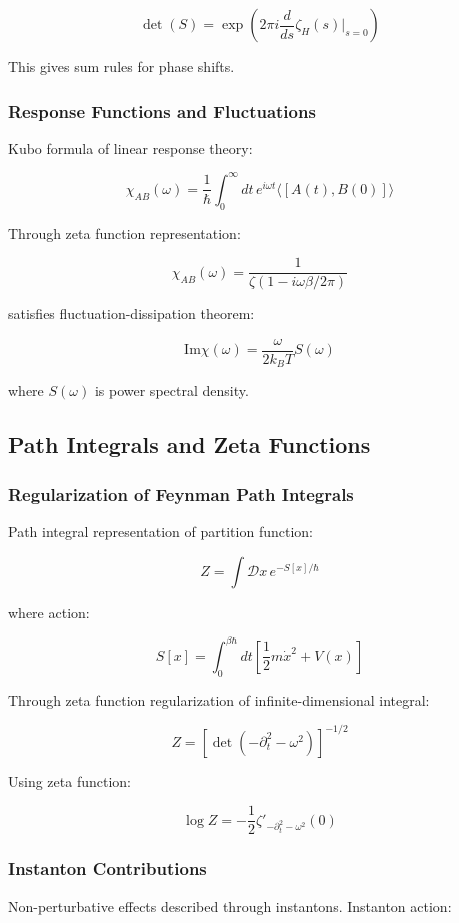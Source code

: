 \documentclass[12pt,a4paper]{article}
\begin{document}
$$\det(S) = \exp\left(2\pi i \frac{d}{ds}\zeta_H(s)\Big|_{s=0}\right)$$

This gives sum rules for phase shifts.

\subsubsection{Response Functions and Fluctuations}

Kubo formula of linear response theory:

$$\chi_{AB}(\omega) = \frac{1}{\hbar} \int_0^{\infty} dt \, e^{i\omega t} \langle[A(t), B(0)]\rangle$$

Through zeta function representation:

$$\chi_{AB}(\omega) = \frac{1}{\zeta(1-i\omega\beta/2\pi)}$$

satisfies fluctuation-dissipation theorem:

$$\text{Im}\chi(\omega) = \frac{\omega}{2k_BT}S(\omega)$$

where $S(\omega)$ is power spectral density.

\subsection{Path Integrals and Zeta Functions}

\subsubsection{Regularization of Feynman Path Integrals}

Path integral representation of partition function:

$$Z = \int \mathcal{D}x \, e^{-S[x]/\hbar}$$

where action:

$$S[x] = \int_0^{\beta\hbar} dt \left[\frac{1}{2}m\dot{x}^2 + V(x)\right]$$

Through zeta function regularization of infinite-dimensional integral:

$$Z = [\det(-\partial_t^2 - \omega^2)]^{-1/2}$$

Using zeta function:

$$\log Z = -\frac{1}{2}\zeta'_{-\partial_t^2-\omega^2}(0)$$

\subsubsection{Instanton Contributions}

Non-perturbative effects described through instantons. Instanton action:
\end{document}
